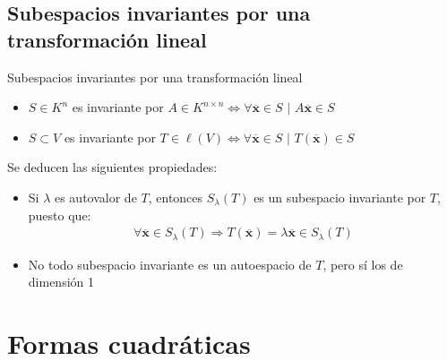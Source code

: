 \documentclass[a4paper, twoside]{article}
\numberwithin{equation}{section}
\numberwithin{figure}{section}
\numberwithin{table}{section}
\newcommand{\vect}[1]{\overline{\textbf{#1}}}
\begin{document}
\subsection{Subespacios invariantes por una transformación lineal}
\begin{definicion*}{Subespacios invariantes por una transformación lineal}
	\begin{itemize}
		\item $S \in K^n$ es invariante por $A \in K^{n \times n} \Longleftrightarrow \forall \vect{x} \in S$ $\vert$ $A\vect{x} \in S$
		\item $S \subset V$ es invariante por $T \in \ell (V) \Longleftrightarrow \forall \vect{x} \in S$ $\vert$ $T(\vect{x}) \in S$
	\end{itemize}
	Se deducen las siguientes propiedades:
	\begin{itemize}
		\item Si $\lambda$ es autovalor de $T$, entonces $S_\lambda(T)$ es un subespacio invariante por $T$, puesto que:
		\begin{align}
			\forall \vect{x} \in S_\lambda(T) \Rightarrow T(\vect{x})=\lambda \vect{x} \in S_\lambda(T)
		\end{align}
		\item No todo subespacio invariante es un autoespacio de $T$, pero sí los de dimensión 1
	\end{itemize}
\end{definicion*}

\newpage
\section{Formas cuadráticas}
\end{document}
